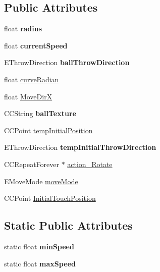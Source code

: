 \subsection*{Public Attributes}
\begin{DoxyCompactItemize}
\item 
\hypertarget{class_j_g___ball_a0b9ed799e748904bac614a68cecd6296}{float {\bfseries radius}}\label{class_j_g___ball_a0b9ed799e748904bac614a68cecd6296}

\item 
\hypertarget{class_j_g___ball_a31660cccfe359fb7ae8448d0abf37e52}{float {\bfseries current\-Speed}}\label{class_j_g___ball_a31660cccfe359fb7ae8448d0abf37e52}

\item 
\hypertarget{class_j_g___ball_a743ed73473f38e9466f305c3f8efe995}{E\-Throw\-Direction {\bfseries ball\-Throw\-Direction}}\label{class_j_g___ball_a743ed73473f38e9466f305c3f8efe995}

\item 
float \hyperlink{class_j_g___ball_ac8ba4747fa629e0bd6df7fb7c422397f}{curve\-Radian}
\item 
float \hyperlink{class_j_g___ball_a790ad2df70ea24be8b2b01482c16c4f9}{Move\-Dir\-X}
\item 
\hypertarget{class_j_g___ball_a8e654f5b766060ae12aa22452f988882}{C\-C\-String {\bfseries ball\-Texture}}\label{class_j_g___ball_a8e654f5b766060ae12aa22452f988882}

\item 
C\-C\-Point \hyperlink{class_j_g___ball_a2cab0645b2eb4374fbfde0b0399c0e72}{temp\-Initial\-Position}
\item 
\hypertarget{class_j_g___ball_a358259dea815fa262327e0af48a6af3c}{E\-Throw\-Direction {\bfseries temp\-Initial\-Throw\-Direction}}\label{class_j_g___ball_a358259dea815fa262327e0af48a6af3c}

\item 
C\-C\-Repeat\-Forever $\ast$ \hyperlink{class_j_g___ball_a602558390080ce6d8cdfcfdbc09f7b12}{action\-\_\-\-Rotate}
\item 
E\-Move\-Mode \hyperlink{class_j_g___ball_a0ad0f2f4b8d03d63c879544111a24506}{move\-Mode}
\item 
C\-C\-Point \hyperlink{class_j_g___ball_aaffad54dc6e381ecaac2f3c7087e5dd7}{Initial\-Touch\-Position}
\end{DoxyCompactItemize}
\subsection*{Static Public Attributes}
\begin{DoxyCompactItemize}
\item 
\hypertarget{class_j_g___ball_a0e5845ccdb93030b567b796f6266e517}{static float {\bfseries min\-Speed}}\label{class_j_g___ball_a0e5845ccdb93030b567b796f6266e517}

\item 
\hypertarget{class_j_g___ball_ad830251662cdf8443962aef638ffefcc}{static float {\bfseries max\-Speed}}\label{class_j_g___ball_ad830251662cdf8443962aef638ffefcc}

\end{DoxyCompactItemize}


